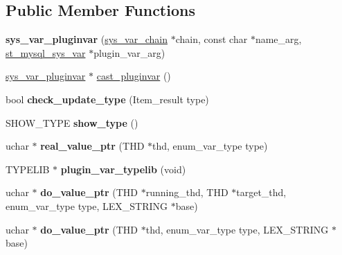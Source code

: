 \subsection*{Public Member Functions}
\begin{DoxyCompactItemize}
\item 
\mbox{\label{classsys__var__pluginvar_a9e2907607e10f6cb8306eb7bdc944ec8}} 
{\bfseries sys\+\_\+var\+\_\+pluginvar} (\mbox{\hyperlink{structsys__var__chain}{sys\+\_\+var\+\_\+chain}} $\ast$chain, const char $\ast$name\+\_\+arg, \mbox{\hyperlink{structst__mysql__sys__var}{st\+\_\+mysql\+\_\+sys\+\_\+var}} $\ast$plugin\+\_\+var\+\_\+arg)
\item 
\mbox{\hyperlink{classsys__var__pluginvar}{sys\+\_\+var\+\_\+pluginvar}} $\ast$ \mbox{\hyperlink{classsys__var__pluginvar_a046db7b6bad8a43d72d0c82ae81653df}{cast\+\_\+pluginvar}} ()
\item 
\mbox{\label{classsys__var__pluginvar_a432d7576d80c0bcd22af002c0ea6430e}} 
bool {\bfseries check\+\_\+update\+\_\+type} (Item\+\_\+result type)
\item 
\mbox{\label{classsys__var__pluginvar_af4f80e9891f96b4b49495dc305fb6393}} 
S\+H\+O\+W\+\_\+\+T\+Y\+PE {\bfseries show\+\_\+type} ()
\item 
\mbox{\label{classsys__var__pluginvar_acdf7c1ae1d4e56cfbbfa9eedb0e6c7c3}} 
uchar $\ast$ {\bfseries real\+\_\+value\+\_\+ptr} (T\+HD $\ast$thd, enum\+\_\+var\+\_\+type type)
\item 
\mbox{\label{classsys__var__pluginvar_a0855ad81beb2c6cead4a6054caf257ba}} 
T\+Y\+P\+E\+L\+IB $\ast$ {\bfseries plugin\+\_\+var\+\_\+typelib} (void)
\item 
\mbox{\label{classsys__var__pluginvar_a6b003c6fa828e2267cf7c5994e3adadf}} 
uchar $\ast$ {\bfseries do\+\_\+value\+\_\+ptr} (T\+HD $\ast$running\+\_\+thd, T\+HD $\ast$target\+\_\+thd, enum\+\_\+var\+\_\+type type, L\+E\+X\+\_\+\+S\+T\+R\+I\+NG $\ast$base)
\item 
\mbox{\label{classsys__var__pluginvar_a8c93496cbb33f3e1b5f5fcbd94e6b78e}} 
uchar $\ast$ {\bfseries do\+\_\+value\+\_\+ptr} (T\+HD $\ast$thd, enum\+\_\+var\+\_\+type type, L\+E\+X\+\_\+\+S\+T\+R\+I\+NG $\ast$base)

\end{DoxyCompactItemize}
